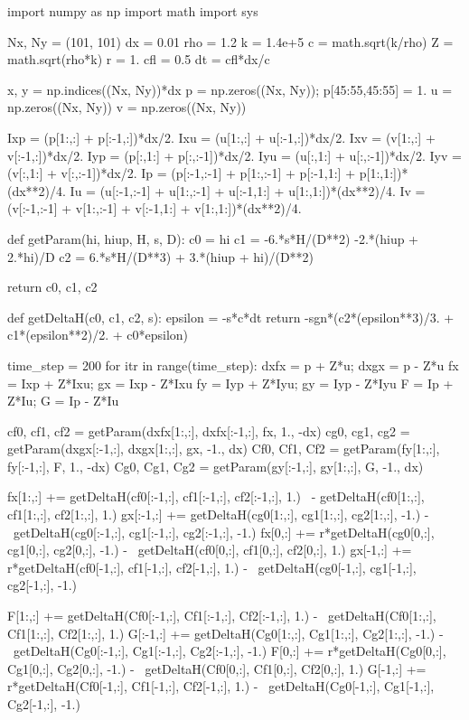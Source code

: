 \documentclass[dvipdfmx, 9pt, a4paper]{jsarticle}
\begin{document}
\begin{python}
import numpy as np
import math
import sys

Nx, Ny = (101, 101)
dx = 0.01
rho = 1.2
k = 1.4e+5
c = math.sqrt(k/rho)
Z = math.sqrt(rho*k)
r = 1.
cfl = 0.5
dt = cfl*dx/c

x, y = np.indices((Nx, Ny))*dx
p = np.zeros((Nx, Ny)); p[45:55,45:55] = 1.
u = np.zeros((Nx, Ny))
v = np.zeros((Nx, Ny))

Ixp = (p[1:,:] + p[:-1,:])*dx/2.
Ixu = (u[1:,:] + u[:-1,:])*dx/2.
Ixv = (v[1:,:] + v[:-1,:])*dx/2.
Iyp = (p[:,1:] + p[:,:-1])*dx/2.
Iyu = (u[:,1:] + u[:,:-1])*dx/2.
Iyv = (v[:,1:] + v[:,:-1])*dx/2.
Ip = (p[:-1,:-1] + p[1:,:-1] + p[:-1,1:] + p[1:,1:])*(dx**2)/4.
Iu = (u[:-1,:-1] + u[1:,:-1] + u[:-1,1:] + u[1:,1:])*(dx**2)/4.
Iv = (v[:-1,:-1] + v[1:,:-1] + v[:-1,1:] + v[1:,1:])*(dx**2)/4.


def getParam(hi, hiup, H, s, D):
	c0 = hi
	c1 = -6.*s*H/(D**2) -2.*(hiup + 2.*hi)/D
	c2 = 6.*s*H/(D**3) + 3.*(hiup + hi)/(D**2)

	return c0, c1, c2

def getDeltaH(c0, c1, c2, s):
	epsilon = -s*c*dt
	return -sgn*(c2*(epsilon**3)/3. + c1*(epsilon**2)/2. + c0*epsilon)

time_step = 200
for itr in range(time_step):
	dxfx = p + Z*u; dxgx = p - Z*u
	fx = Ixp + Z*Ixu; gx = Ixp - Z*Ixu
	fy = Iyp + Z*Iyu; gy = Iyp - Z*Iyu
	F = Ip + Z*Iu; G = Ip - Z*Iu

	cf0, cf1, cf2 = getParam(dxfx[1:,:], dxfx[:-1,:], fx, 1., -dx)
	cg0, cg1, cg2 = getParam(dxgx[:-1,:], dxgx[1:,:], gx, -1., dx)
	Cf0, Cf1, Cf2 = getParam(fy[1:,:], fy[:-1,:], F, 1., -dx)
	Cg0, Cg1, Cg2 = getParam(gy[:-1,:], gy[1:,:], G, -1., dx)

	fx[1:,:] += getDeltaH(cf0[:-1,:], cf1[:-1,:], cf2[:-1,:], 1.) \
	- getDeltaH(cf0[1:,:], cf1[1:,:], cf2[1:,:], 1.)
	gx[:-1,:] += getDeltaH(cg0[1:,:], cg1[1:,:], cg2[1:,:], -1.) - \
	getDeltaH(cg0[:-1,:], cg1[:-1,:], cg2[:-1,:], -1.)
	fx[0,:] += r*getDeltaH(cg0[0,:], cg1[0,:], cg2[0,:], -1.) - \
	getDeltaH(cf0[0,:], cf1[0,:], cf2[0,:], 1.)
	gx[-1,:] += r*getDeltaH(cf0[-1,:], cf1[-1,:], cf2[-1,:], 1.) - \
	getDeltaH(cg0[-1,:], cg1[-1,:], cg2[-1,:], -1.)

	F[1:,:] += getDeltaH(Cf0[:-1,:], Cf1[:-1,:], Cf2[:-1,:], 1.) - \
	getDeltaH(Cf0[1:,:], Cf1[1:,:], Cf2[1:,:], 1.)
	G[:-1,:] += getDeltaH(Cg0[1:,:], Cg1[1:,:], Cg2[1:,:], -1.) - \
	getDeltaH(Cg0[:-1,:], Cg1[:-1,:], Cg2[:-1,:], -1.)
	F[0,:] += r*getDeltaH(Cg0[0,:], Cg1[0,:], Cg2[0,:], -1.) - \
	getDeltaH(Cf0[0,:], Cf1[0,:], Cf2[0,:], 1.)
	G[-1,:] += r*getDeltaH(Cf0[-1,:], Cf1[-1,:], Cf2[-1,:], 1.) - \
	getDeltaH(Cg0[-1,:], Cg1[-1,:], Cg2[-1,:], -1.)


\end{python}
\end{document}
